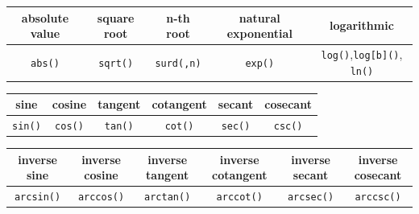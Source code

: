 \documentclass[en,11pt,simple]{elegantbook}
\begin{document}
\begin{longtable}[]{@{}ccccc@{}}
\toprule
absolute value & square root & n-th root & natural exponential & logarithmic\tabularnewline
\midrule
\endhead
\texttt{abs()} & \texttt{sqrt()} & \texttt{surd(,n)} & \texttt{exp()} & \texttt{log()},\texttt{log{[}b{]}()}, \texttt{ln()}\tabularnewline
\bottomrule
\end{longtable}

\begin{longtable}[]{@{}cccccc@{}}
\toprule
sine & cosine & tangent & cotangent & secant & cosecant\tabularnewline
\midrule
\endhead
\texttt{sin()} & \texttt{cos()} & \texttt{tan()} & \texttt{cot()} & \texttt{sec()} & \texttt{csc()}\tabularnewline
\bottomrule
\end{longtable}

\begin{longtable}[]{@{}cccccc@{}}
\toprule
\begin{minipage}[b]{0.13\columnwidth}\centering
inverse sine\strut
\end{minipage} & \begin{minipage}[b]{0.13\columnwidth}\centering
inverse cosine\strut
\end{minipage} & \begin{minipage}[b]{0.13\columnwidth}\centering
inverse tangent\strut
\end{minipage} & \begin{minipage}[b]{0.16\columnwidth}\centering
inverse cotangent\strut
\end{minipage} & \begin{minipage}[b]{0.13\columnwidth}\centering
inverse secant\strut
\end{minipage} & \begin{minipage}[b]{0.15\columnwidth}\centering
inverse cosecant\strut
\end{minipage}\tabularnewline
\midrule
\endhead
\begin{minipage}[t]{0.13\columnwidth}\centering
\texttt{arcsin()}\strut
\end{minipage} & \begin{minipage}[t]{0.13\columnwidth}\centering
\texttt{arccos()}\strut
\end{minipage} & \begin{minipage}[t]{0.13\columnwidth}\centering
\texttt{arctan()}\strut
\end{minipage} & \begin{minipage}[t]{0.16\columnwidth}\centering
\texttt{arccot()}\strut
\end{minipage} & \begin{minipage}[t]{0.13\columnwidth}\centering
\texttt{arcsec()}\strut
\end{minipage} & \begin{minipage}[t]{0.15\columnwidth}\centering
\texttt{arccsc()}\strut
\end{minipage}\tabularnewline
\bottomrule
\end{longtable}
\end{document}
